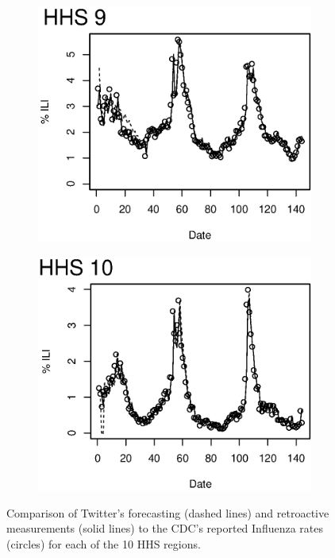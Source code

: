 \begin{figure}
\begin{subfigure}[b]{0.49\textwidth}
	\includegraphics[width=\textwidth]{longitude/figs/nowcastHHS_9.eps}
\end{subfigure}
\begin{subfigure}[b]{0.49\textwidth}
	\includegraphics[width=\textwidth]{longitude/figs/nowcastHHS_10.eps}
\end{subfigure}\caption{Comparison of Twitter's forecasting (dashed lines) and retroactive measurements (solid lines) to the CDC's reported Influenza rates (circles) for each of the 10 HHS regions.}
\label{fig:hhs_curves_all}
\end{figure}


